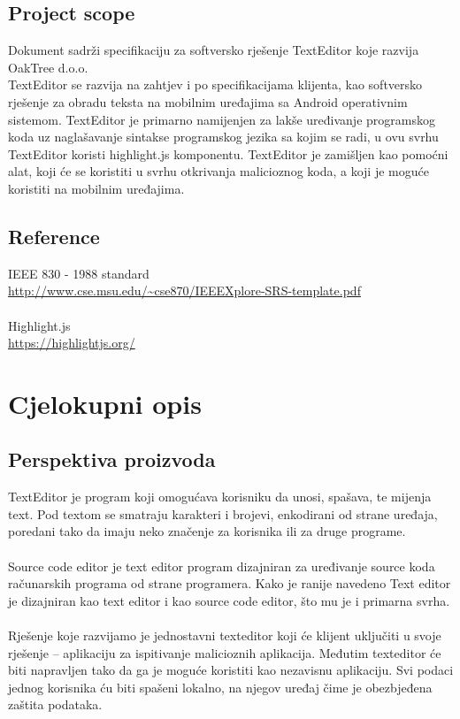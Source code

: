 \documentclass[12pt]{article}
\begin{document}
\subsection{Project scope}

Dokument sadrži specifikaciju za softversko rješenje TextEditor koje razvija OakTree d.o.o.\\
TextEditor se razvija na zahtjev i po specifikacijama klijenta, kao softversko rješenje za obradu teksta na mobilnim uređajima sa Android operativnim sistemom. TextEditor je primarno namijenjen za lakše uređivanje programskog koda uz naglašavanje sintakse programskog jezika sa kojim se radi, u ovu svrhu TextEditor koristi highlight.js komponentu. TextEditor je zamišljen kao pomoćni alat, koji će se koristiti u svrhu otkrivanja malicioznog koda, a koji je moguće koristiti na mobilnim uređajima.

\subsection{Reference}

IEEE 830 - 1988 standard \\
\url{http://www.cse.msu.edu/~cse870/IEEEXplore-SRS-template.pdf} \\ \\
Highlight.js \\
\url{https://highlightjs.org/}

\section{Cjelokupni opis}
\subsection{Perspektiva proizvoda}

TextEditor je program koji omogućava korisniku da unosi, spašava, te mijenja text. Pod textom se smatraju karakteri i brojevi, enkodirani od strane uređaja, poredani tako da imaju neko značenje za korisnika ili za druge programe.\\ \\
Source code editor je text editor program dizajniran za uređivanje source koda računarskih programa od strane programera.
Kako je ranije navedeno Text editor je dizajniran kao text editor i kao source code editor, što mu je i primarna svrha.\\ \\
Rješenje koje razvijamo je jednostavni texteditor koji će klijent uključiti u svoje rješenje – aplikaciju za ispitivanje malicioznih aplikacija. Međutim texteditor će biti napravljen tako da ga je moguće koristiti kao nezavisnu aplikaciju. 
Svi podaci jednog korisnika ću biti spašeni lokalno, na njegov uređaj čime je obezbjeđena zaštita podataka.
\end{document}
